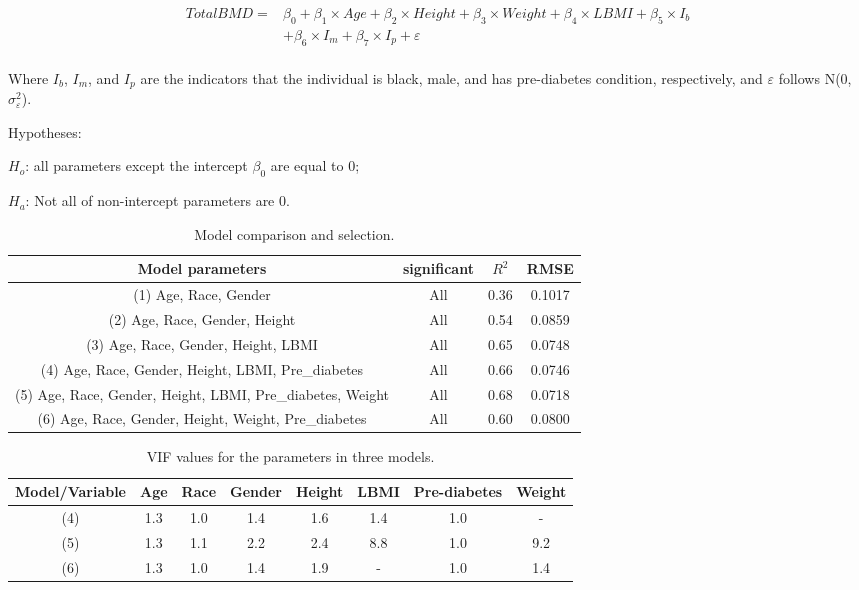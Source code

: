 \documentclass[11pt]{article}
\begin{document}
\begin{equation}
\begin{split}
TotalBMD = &\beta_0+\beta_1\times Age +\beta_2\times Height +\beta_3\times Weight +\beta_4\times LBMI + \beta_5\times I_b \\
& + \beta_6\times I_m+\beta_7\times I_p+\varepsilon \\
\end{split}
\end{equation}

Where $I_b$, $I_m$, and $I_p$ are the indicators that the individual is black, male, and has pre-diabetes condition, respectively, and $\varepsilon$ follows N(0, $\sigma_\varepsilon^2$).

\bigskip
Hypotheses:
\medskip

$H_o$: all parameters except the intercept $\beta_0$ are equal to 0; 

$H_a$: Not all of non-intercept parameters are 0.

           \begin{table}[ht]
			\centering
				\caption{Model comparison and selection.\label{data3}}
				\begin{tabular}{|c|c|c|c|}
				\hline
    Model parameters & significant & $R^2$ & RMSE\\\hline 
(1) Age, Race, Gender   &   All   & 0.36 & 0.1017 \\\hline 
(2) Age, Race, Gender, Height   &   All   & 0.54 & 0.0859 \\\hline 
(3) Age, Race, Gender, Height, LBMI   &   All   & 0.65 & 0.0748 \\\hline 
(4) Age, Race, Gender, Height, LBMI, Pre\_diabetes   &   All   & 0.66 & 0.0746 \\\hline 
(5) Age, Race, Gender, Height, LBMI, Pre\_diabetes, Weight   &   All   & 0.68 & 0.0718 \\\hline 
(6) Age, Race, Gender, Height, Weight, Pre\_diabetes   &   All   & 0.60 & 0.0800 \\\hline 
				\end{tabular}
			\end{table}	
 
            \begin{table}[ht]
			\centering
				\caption{VIF values for the parameters in three models.\label{data3}}
				\begin{tabular}{|c|c|c|c|c|c|c|c|}
				\hline
   Model/Variable & Age & Race & Gender & Height & LBMI & Pre-diabetes &Weight\\\hline 
   (4) & 1.3 & 1.0 & 1.4 & 1.6 & 1.4 & 1.0 &-\\\hline
   (5) & 1.3 & 1.1 & 2.2 & 2.4 & 8.8 & 1.0 &9.2\\\hline
   (6) & 1.3 & 1.0 & 1.4 & 1.9 & - & 1.0 &1.4\\\hline
				\end{tabular}
			\end{table}	
			
\end{document}
